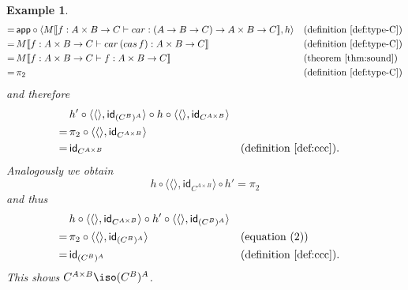 \documentclass{article}
\newtheorem{exmpl}[defn]{Example}
\newtheorem{theorem}[defn]{Theorem}
\newcommand{\type}{\vdash}
\newcommand{\id}{\mathsf{id}}
\begin{document}
\begin{exmpl}
\begin{align*}
        = \,& \mathsf{app} \circ \langle M|[f: A \times B \to C \vdash car: (A \to B \to C) \to A \times B \to C|] , h \rangle && (\text{definition}~\ref{def:type-C})\\
        = \,& M|[f: A \times B \to C \vdash car\,(cas \,f): A \times B \to C|] && (\text{definition}~\ref{def:type-C}) \\
        = \,& M|[f: A \times B \to C \vdash f: A \times B \to C|] && (\text{theorem}~\ref{thm:sound})\\
        = \,& \pi_2 && (\text{definition}~\ref{def:type-C})
    \end{align*}
    and therefore
    \begin{align*}
        & h' \circ \langle\langle\rangle, \id_{(C^B)^A}\rangle \circ h \circ \langle \langle\rangle, \id_{C^{A \times B}} \rangle \\
        =\, & \pi_2 \circ \langle \langle\rangle, \id_{C^{A \times B}} \rangle \\
        =\, & \id_{C^{A \times B}} && (\text{definition}~\ref{def:ccc}).
    \end{align*}
    Analogously we obtain
    \[ h \circ \langle \langle\rangle, \id_{C^{A \times B}} \rangle \circ h' = \pi_2 \tag{2} \]
    and thus
    \begin{align*}
        & h \circ \langle \langle\rangle, \id_{C^{A \times B}} \rangle \circ h' \circ \langle\langle\rangle, \id_{(C^B)^A}\rangle \\
        =\, & \pi_2 \circ \langle\langle\rangle, \id_{(C^B)^A}\rangle && (\text{equation}~(2))\\
        =\, & \id_{(C^B)^A} && (\text{definition}~\ref{def:ccc}).
    \end{align*}
    This shows $C^{A \times B} \iso (C^B)^A$.
\end{exmpl}


\iffalse
\section{Free Cartesian Closed Categories}
\label{sec:free}

\begin{theorem}
    \label{thm:compl}
    If $M|[\Gamma\type s: A|] = M|[\Gamma\type t: A|]$ for every mapping $M$ of ground types and constants and every cartesian closed category $\cat{C}$,
    then $\Gamma \type s =_{\beta\eta} t: A$.
\end{theorem}
\begin{proof}
    We give a proof sketch.

\end{proof}
\fi


\nocite{*}


\end{document}

